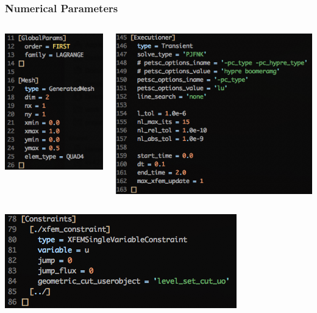 \documentclass[]{beamer}
\begin{document}
\begin{frame}\frametitle{Numerical Parameters}
  	\begin{columns}
			\begin{center}
			\includegraphics[scale=0.4]{figures/1D_xy_ls1m/Screen-GlobalParams-1Dxyls1m}
			\end{center}
			\begin{center}
			\includegraphics[scale=0.4]{figures/1D_xy_ls1m/Screen-Executioner-1Dxyls1m}
			\end{center}
	\end{columns}
	\begin{center}
	\includegraphics[scale=0.4]{figures/1D_xy_ls1m/Screen-Constraints-1Dxyls1m}
	\end{center}
\end{frame}
\end{document}
